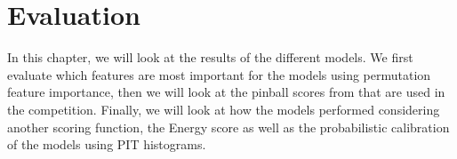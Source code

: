 \chapter{Evaluation}
\label{ch:Evaluation}

In this chapter, we will look at the results of the different models. 
We first evaluate which features are most important for the models using 
permutation feature importance, then we will look at the pinball scores from 
that are used in the competition. Finally, we will look at how the models performed 
considering another scoring function, the Energy score as well as the probabilistic calibration 
of the models using PIT histograms.







